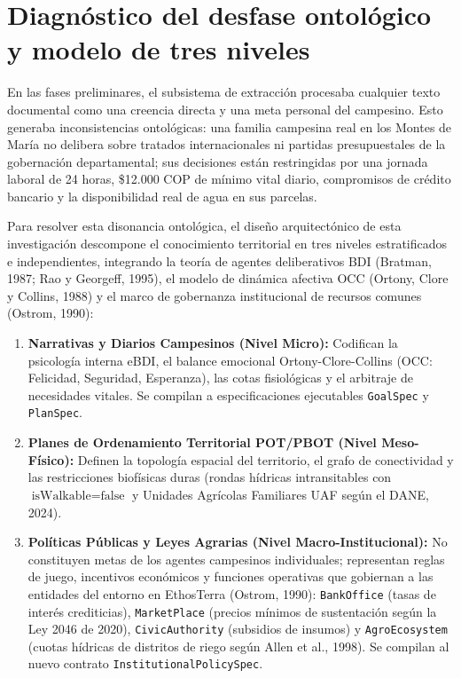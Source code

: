 \documentclass[11pt,a4paper]{article}
\begin{document}
\section{Diagn\'ostico del desfase ontol\'ogico y modelo de tres niveles}

En las fases preliminares, el subsistema de extracci\'on procesaba cualquier texto documental como una creencia directa y una meta personal del campesino. Esto generaba inconsistencias ontol\'ogicas: una familia campesina real en los Montes de Mar\'ia no delibera sobre tratados internacionales ni partidas presupuestales de la gobernaci\'on departamental; sus decisiones est\'an restringidas por una jornada laboral de 24 horas, \$12.000 COP de m\'inimo vital diario, compromisos de cr\'edito bancario y la disponibilidad real de agua en sus parcelas.

Para resolver esta disonancia ontol\'ogica, el dise\~no arquitect\'onico de esta investigaci\'on descompone el conocimiento territorial en tres niveles estratificados e independientes, integrando la teor\'ia de agentes deliberativos BDI (Bratman, 1987; Rao y Georgeff, 1995), el modelo de din\'amica afectiva OCC (Ortony, Clore y Collins, 1988) y el marco de gobernanza institucional de recursos comunes (Ostrom, 1990):

\begin{enumerate}[leftmargin=*]
    \item \textbf{Narrativas y Diarios Campesinos (Nivel Micro):} Codifican la psicolog\'ia interna eBDI, el balance emocional Ortony-Clore-Collins (OCC: Felicidad, Seguridad, Esperanza), las cotas fisiol\'ogicas y el arbitraje de necesidades vitales. Se compilan a especificaciones ejecutables \texttt{GoalSpec} y \texttt{PlanSpec}.
    \item \textbf{Planes de Ordenamiento Territorial POT/PBOT (Nivel Meso-F\'isico):} Definen la topolog\'ia espacial del territorio, el grafo de conectividad y las restricciones biof\'isicas duras (rondas h\'idricas intransitables con $\text{isWalkable} = \text{false}$ y Unidades Agr\'icolas Familiares UAF seg\'un el DANE, 2024).
    \item \textbf{Pol\'iticas P\'ublicas y Leyes Agrarias (Nivel Macro-Institucional):} No constituyen metas de los agentes campesinos individuales; representan reglas de juego, incentivos econ\'omicos y funciones operativas que gobiernan a las entidades del entorno en EthosTerra (Ostrom, 1990): \texttt{BankOffice} (tasas de inter\'es crediticias), \texttt{MarketPlace} (precios m\'inimos de sustentaci\'on seg\'un la Ley 2046 de 2020), \texttt{CivicAuthority} (subsidios de insumos) y \texttt{AgroEcosystem} (cuotas h\'idricas de distritos de riego seg\'un Allen et al., 1998). Se compilan al nuevo contrato \texttt{InstitutionalPolicySpec}.
\end{enumerate}
\end{document}
